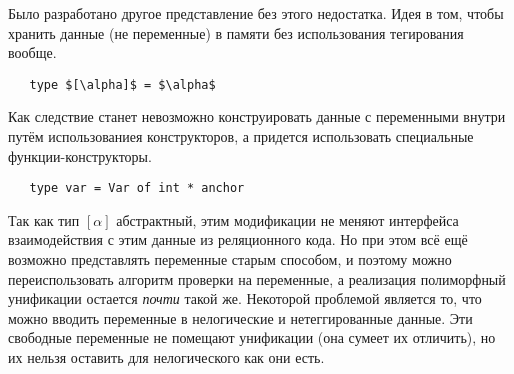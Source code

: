 
Было разработано другое представление без этого недостатка.
Идея в том, чтобы хранить данные (не переменные) в памяти без использования тегирования вообще.

\begin{lstlisting}
   type $[\alpha]$ = $\alpha$
\end{lstlisting}

\noindent Как следствие станет невозможно конструировать данные с переменными внутри путём использованиея конструкторов,
а придется использовать специальные функции-конструкторы.


\begin{lstlisting}
   type var = Var of int * anchor
\end{lstlisting}

\noindent Так как тип $[\alpha]$ абстрактный, этим модификации не меняют интерфейса взаимодействия с этим данные из реляционного кода.
Но при этом всё ещё возможно представлять переменные старым способом, и поэтому можно переиспользовать алгоритм проверки на переменные,
а реализация полиморфный унификации остается \emph{почти} такой же.
Некоторой проблемой является то, что можно вводить переменные в нелогические и нетеггированные данные.
Эти свободные переменные не помещают унификации (она сумеет их отличить), но их нельзя оставить для нелогического как они есть.


